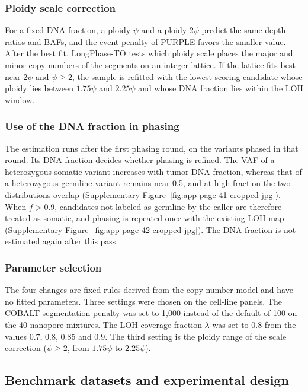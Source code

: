 \documentclass[unnumsec,webpdf,contemporary,large]{oup-authoring-template}
\begin{document}
\subsubsection{Ploidy scale correction}

For a fixed DNA fraction, a ploidy $\psi$ and a ploidy $2\psi$ predict the same depth ratios and BAFs, and the event penalty of PURPLE favors the smaller value. After the best fit, LongPhase-TO tests which ploidy scale places the major and minor copy numbers of the segments on an integer lattice. If the lattice fits best near $2\psi$ and $\psi \ge 2$, the sample is refitted with the lowest-scoring candidate whose ploidy lies between $1.75\psi$ and $2.25\psi$ and whose DNA fraction lies within the LOH window.

\subsubsection{Use of the DNA fraction in phasing}

The estimation runs after the first phasing round, on the variants phased in that round. Its DNA fraction decides whether phasing is refined. The VAF of a heterozygous somatic variant increases with tumor DNA fraction, whereas that of a heterozygous germline variant remains near 0.5, and at high fraction the two distributions overlap (Supplementary Figure~\ref{fig:app-page-41-cropped-jpg}). When $f > 0.9$, candidates not labeled as germline by the caller are therefore treated as somatic, and phasing is repeated once with the existing LOH map (Supplementary Figure~\ref{fig:app-page-42-cropped-jpg}). The DNA fraction is not estimated again after this pass.

\subsubsection{Parameter selection}

The four changes are fixed rules derived from the copy-number model and have no fitted parameters. Three settings were chosen on the cell-line panels. The COBALT segmentation penalty was set to 1,000 instead of the default of 100 on the 40 nanopore mixtures. The LOH coverage fraction $\lambda$ was set to 0.8 from the values 0.7, 0.8, 0.85 and 0.9. The third setting is the ploidy range of the scale correction ($\psi \ge 2$, from $1.75\psi$ to $2.25\psi$).


\subsection{Benchmark datasets and experimental design}
\end{document}
